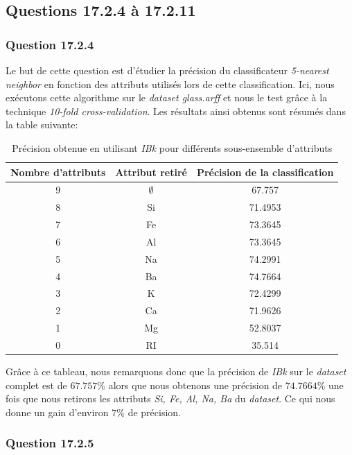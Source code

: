 \documentclass[10pt,a4paper]{article}
\begin{document}
		\subsection{Questions 17.2.4 à 17.2.11}
		
			\subsubsection*{Question 17.2.4}
				Le but de cette question est d'étudier la précision du classificateur \textit{5-nearest neighbor} en fonction des attributs utilisés lors de cette classification. Ici, nous exécutons cette algorithme sur le \textit{dataset glass.arff} et nous le test grâce à la technique \textit{10-fold cross-validation}. Les résultats ainsi obtenus sont résumés dans la table suivante:
				
				\begin{table}[h]
					\centering
					\caption{Précision obtenue en utilisant \textit{IBk} pour différents sous-ensemble d'attributs}
					\begin{tabular}{|c|c|c|}
						\hline
						Nombre d'attributs & Attribut retiré & Précision de la classification\\
						\hline
						9 & $\emptyset$ & 67.757 \\
						\hline
						8 & Si & 71.4953 \\
						\hline
						7 & Fe & 73.3645 \\
						\hline
						6 & Al & 73.3645 \\
						\hline
						5 & Na & 74.2991 \\
						\hline
						4 & Ba & 74.7664 \\
						\hline
						3 & K & 72.4299 \\
						\hline
						2 & Ca & 71.9626 \\
						\hline
						1 & Mg & 52.8037 \\
						\hline
						0 & RI & 35.514\\
						\hline
					\end{tabular}
				\end{table}
				
				Grâce à ce tableau, nous remarquons donc que la précision de \textit{IBk} sur le \textit{dataset} complet est de $67.757\%$ alors que nous obtenons une précision de $74.7664\%$ une fois que nous retirons les attributs \textit{Si, Fe, Al, Na, Ba} du \textit{dataset}. Ce qui nous donne un gain d'environ $7\%$ de précision.
			
			\subsubsection*{Question 17.2.5}
			
\end{document}
